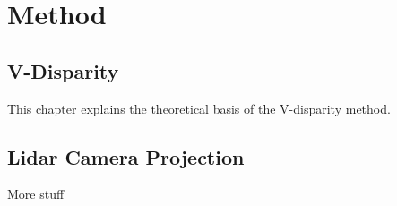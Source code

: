 
\chapter{Method}
\label{chp:Method}

\section{V-Disparity}

This chapter explains the theoretical basis of the V-disparity method.

\section{Lidar Camera Projection}

More stuff